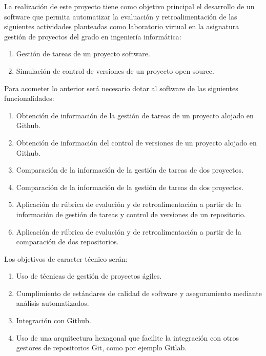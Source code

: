 
La realización de este proyecto tiene como objetivo principal el desarrollo de un software que permita automatizar la evaluación y retroalimentación de las siguientes actividades planteadas como laboratorio virtual en la asignatura gestión de proyectos del grado en ingeniería informática:

\begin{enumerate}
	\item Gestión de tareas de un proyecto software. 
	\item Simulación de control de versiones de un proyecto open source.
\end{enumerate}

Para acometer lo anterior será necesario dotar al software de las siguientes funcionalidades:

\begin{enumerate}
	\item Obtención de información de la gestión de tareas de un proyecto alojado en Github.	
	\item Obtención de información del control de versiones de un proyecto alojado en Github.
	\item Comparación de la información de la gestión de tareas de dos proyectos.
	\item Comparación de la información de la gestión de tareas de dos proyectos.			
	\item Aplicación de rúbrica de evalución y de retroalimentación a partir de la información de gestión de tareas y control de versiones de un repositorio.
	\item Aplicación de rúbrica de evalución y de retroalimentación a partir de la comparación de dos repositorios.	 		  
\end{enumerate}

Los objetivos de caracter técnico serán:

\begin{enumerate}
	\item Uso de técnicas de gestión de proyectos ágiles.
	\item Cumplimiento de estándares de calidad de software y aseguramiento mediante análisis automatizados.
	\item Integración con Github. 
	\item Uso de una arquitectura hexagonal que facilite la integración con otros gestores de repositorios Git, como por ejemplo Gitlab.
\end{enumerate}

